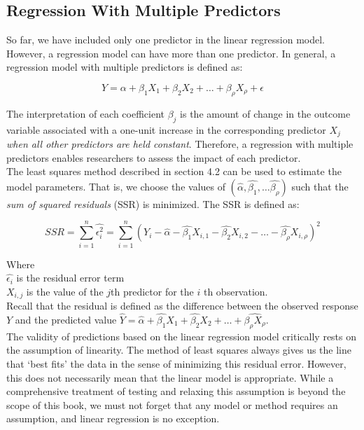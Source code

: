 \documentclass{article}
\begin{document}
    \subsection{Regression With Multiple Predictors}

    \noindent So far, we have included only one predictor in the linear
regression model. However, a regression model can have more than one
predictor. In general, a regression model with multiple predictors is
defined as:

    \[
        Y = \alpha + \beta_{1}X_1 + \beta_{2}X_2 + \dots + \beta_{\rho}X_{\rho} + \epsilon
    \]

    \noindent The interpretation of each coefficient $\beta_{j}$ is the
amount of change in the outcome variable associated with a one-unit increase
in the corresponding predictor $X_j$
\textit{when all other predictors are held constant}. Therefore, a
regression with multiple predictors enables researchers to assess the impact
of each predictor.\\

    \noindent The least squares method described in section 4.2 can be used
to estimate the model parameters. That is, we choose the values of
$(\hat{\alpha}, \hat{\beta_1}, \dots \hat{\beta_{\rho}})$ such that the \textit{sum of squared residuals} (SSR) is minimized. The SSR is defined as:

    \[
        SSR = \sum^{n}_{i=1}\hat{\epsilon^2_i}
            = \sum^{n}_{i=1}(Y_i - \hat{\alpha} - \hat{\beta_1}X_{i,1} - \hat{\beta_2}X_{i,2} - \dots - \hat{\beta_{\rho}}X_{i, \rho})^2
    \]

    \indent Where \\
    \indent \indent $\hat{\epsilon_i}$ is the residual error term\\
    \indent \indent $X_{i,j}$ is the value of the $j$th predictor for the $i$
th observation.\\

    \noindent Recall that the residual is defined as the difference between
the observed response $Y$ and the predicted value $\hat{Y} = \hat{\alpha} + \hat{\beta_1}X_1 + \hat{\beta_2}X_2 + \dots + \hat{\beta_{\rho}X_{\rho}}$.\\

    \noindent The validity of predictions based on the linear regression
model critically rests on the assumption of linearity. The method of least
squares always gives us the line that `best fits' the data in the sense of
minimizing this residual error. However, this does not necessarily mean that
the linear model is appropriate. While a comprehensive treatment of testing
and relaxing this assumption is beyond the scope of this book, we must not
forget that any model or method requires an assumption, and linear
regression is no exception.\\
\end{document}
